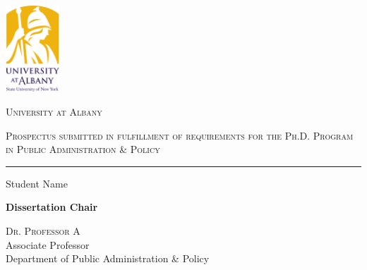 \thispagestyle{empty}
\begin{titlepage}
	\centering
	\includegraphics[trim=-0 0 0 40cm,width=0.15\textwidth]{Ancillary/SunyLogo.png}\par
	\vspace{0.5cm}
	{\scshape\LARGE University at Albany \par}
	\vspace{1cm}
	{\scshape Prospectus submitted in fulfillment of requirements for the Ph.D. Program in Public Administration \& Policy \par}
	\vspace{0.4cm}
	\vspace{0.4cm}
	
	{\LARGE \TheTitle \par}
	\vspace{0.3cm}
	
	
	{\rule{5cm}{0.3mm} \par}
	\vspace{0.4cm}
	
	{\Large Student Name \par}
	\vspace{0.5cm}

	{\bfseries Dissertation Chair \par}
	\vspace{2mm}
	\textsc{Dr. Professor A} \\
	Associate Professor \\
	Department of Public Administration \& Policy \\
	\vspace{5mm}
	

\end{titlepage}
